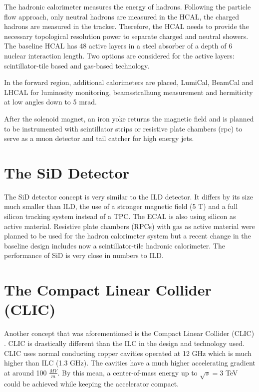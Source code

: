 The hadronic calorimeter measures the energy of hadrons. Following the particle flow approach, only neutral hadrons are measured in the HCAL, the charged hadrons are measured in the tracker. Therefore, the HCAL needs to provide the necessary topological resolution power to separate charged and neutral showers. The baseline HCAL has 48 active layers in a steel absorber of a depth of 6 nuclear interaction length. Two options are considered for the active layers: scintillator-tile based and gas-based technology.

In the forward region, additional calorimeters are placed, LumiCal, BeamCal and LHCAL for luminosity monitoring, beamsstralhung measurement and hermiticity at low angles down to 5 mrad.

After the solenoid magnet, an iron yoke returns the magnetic field and is planned to be instrumented with scintillator strips or resistive plate chambers (\acrshort{rpc}) to serve as a muon detector and tail catcher for high energy jets.

\section{The SiD Detector}

The SiD detector concept is very similar to the ILD detector. It differs by its size much smaller than ILD, the use of a stronger magnetic field (5 T) and a full silicon tracking system instead of a TPC. The ECAL is also using silicon as active material. Resistive plate chambers (RPCs) with gas as active material were planned to be used for the hadron calorimeter system but a recent change in the baseline design includes now a scintillator-tile hadronic calorimeter. The performance of SiD is very close in numbers to ILD.

\section{The Compact Linear Collider (CLIC)}

Another concept that was aforementioned is the Compact Linear Collider (CLIC) \cite{CLIC_CDR}. CLIC is drastically different than the ILC in the design and technology used. CLIC uses normal conducting copper cavities operated at 12 GHz which is much higher than ILC (1.3 GHz). The cavities have a much higher accelerating gradient at around 100 $\frac{MV}{m}$. By this mean, a center-of-mass energy up to $\sqrt{s} = 3$ TeV could be achieved while keeping the accelerator compact.

